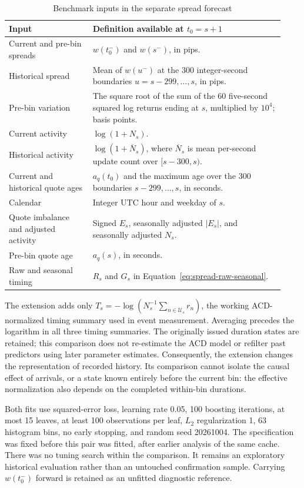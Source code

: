 \documentclass[12pt,letterpaper]{article}
\begin{document}
\begin{table}[tbp]
\centering\small
\caption{Benchmark inputs in the separate spread forecast}
\label{tab:spread-features}
\begin{tabular}{p{0.29\linewidth}p{0.64\linewidth}}
\toprule
Input & Definition available at $t_0=s+1$ \\
\midrule
Current and pre-bin spreads & $w(t_0^-)$ and $w(s^-)$, in pips. \\
Historical spread & Mean of $w(u^-)$ at the 300 integer-second boundaries $u=s-299,\ldots,s$, in pips. \\
Pre-bin variation & The square root of the sum of the 60 five-second squared log returns ending at $s$, multiplied by $10^4$; basis points. \\
Current activity & $\log(1+N_s)$. \\
Historical activity & $\log(1+\overline N_s)$, where $\overline N_s$ is mean per-second update count over $[s-300,s)$. \\
Current and historical quote ages & $a_q(t_0)$ and the maximum age over the 300 boundaries $s-299,\ldots,s$, in seconds. \\
Calendar & Integer UTC hour and weekday of $s$. \\
Quote imbalance and adjusted activity & Signed $E_s$, seasonally adjusted $|E_s|$, and seasonally adjusted $N_s$. \\
Pre-bin quote age & $a_q(s)$, in seconds. \\
Raw and seasonal timing & $R_s$ and $G_s$ in Equation~\eqref{eq:spread-raw-seasonal}. \\
\bottomrule
\end{tabular}
\end{table}

The extension adds only $T_s=-\log(N_s^{-1}\sum_{n\in\mathcal{U}_s}r_n)$, the working ACD-normalized timing summary used in event measurement. Averaging precedes the logarithm in all three timing summaries. The originally issued duration states are retained; this comparison does not re-estimate the ACD model or refilter past predictors using later parameter estimates. Consequently, the extension changes the representation of recorded history. Its comparison cannot isolate the causal effect of arrivals, or a state known entirely before the current bin: the effective normalization also depends on the completed within-bin durations.

Both fits use squared-error loss, learning rate 0.05, 100 boosting iterations, at most 15 leaves, at least 100 observations per leaf, $L_2$ regularization 1, 63 histogram bins, no early stopping, and random seed 20261004. The specification was fixed before this pair was fitted, after earlier analysis of the same cache. There was no tuning search within the comparison. It remains an exploratory historical evaluation rather than an untouched confirmation sample. Carrying $w(t_0^-)$ forward is retained as an unfitted diagnostic reference.
\end{document}
